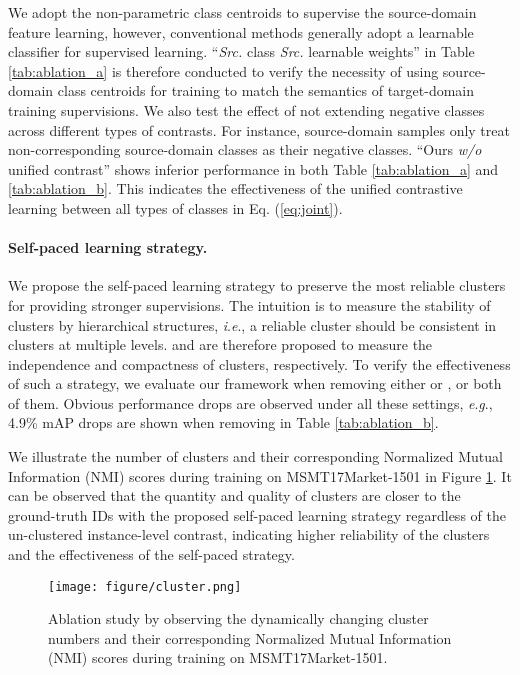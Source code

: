 \documentclass{article}
\newcommand{\ie}{\textit{i}.\textit{e}., }
\newcommand{\eg}{\textit{e}.\textit{g}., }
\begin{document}
We adopt the non-parametric class centroids to supervise the source-domain feature learning,
however, conventional methods generally adopt a learnable classifier for supervised learning.
``\textit{Src.} class  \textit{Src.} learnable weights'' in Table \ref{tab:ablation_a} is therefore conducted to verify the necessity of using source-domain class centroids for training to match the semantics of target-domain training supervisions. 
We also test the effect of not extending negative classes across different types of contrasts. 
For instance, 
source-domain samples only treat non-corresponding source-domain classes as their negative classes. 
``Ours \textit{w/o} unified contrast'' shows inferior performance in both Table \ref{tab:ablation_a} and  \ref{tab:ablation_b}.
This indicates the effectiveness of the unified contrastive learning between all types of classes in Eq. (\ref{eq:joint}).

\vspace{-5pt}
\paragraph{Self-paced learning strategy.}
We propose the self-paced learning strategy to preserve the most reliable clusters for providing stronger supervisions.
The intuition is to measure the stability of clusters by hierarchical structures, \ie a reliable cluster should be consistent in clusters at multiple levels.
 and  are therefore proposed to measure the independence and compactness of clusters, respectively.
To verify the effectiveness of such a strategy,
we evaluate our framework when removing either  or , or both of them.
Obvious performance drops are observed 
under all these settings,
\eg 4.9\% mAP drops are shown when removing  in Table  \ref{tab:ablation_b}.


We illustrate the number of clusters and their corresponding Normalized Mutual Information (NMI) scores during training on MSMT17Market-1501 in Figure \ref{fig:cluster_num}. It can be observed that 
the quantity and quality of clusters are closer to the ground-truth IDs 
with the proposed self-paced learning strategy regardless of the un-clustered instance-level contrast, 
indicating higher reliability of the clusters and the effectiveness of the self-paced strategy.


\begin{figure}[th]
\centering
\vspace{-5pt}
\texttt{[image: figure/cluster.png]}
\vspace{-3pt}
\caption{Ablation study by observing the dynamically changing cluster numbers and their corresponding Normalized Mutual Information (NMI) scores during training on MSMT17Market-1501.}
\label{fig:cluster_num}
\end{figure}
\end{document}
